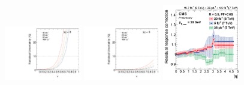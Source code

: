 \begin{figure}[h]
\begin{center}
\includegraphics[width= 0.3\textwidth]{figures/xStat_eta3_inclusiveJet.pdf}
\includegraphics[width= 0.3\textwidth]{figures/xStat_eta5_inclusiveJet.pdf}
\includegraphics[width= 0.3\textwidth]{figures/staterror_jec_luminosity_pp.png}
\caption{}
\label{fig:XreachWithPseudorapidity}
\end{center}
\end{figure}